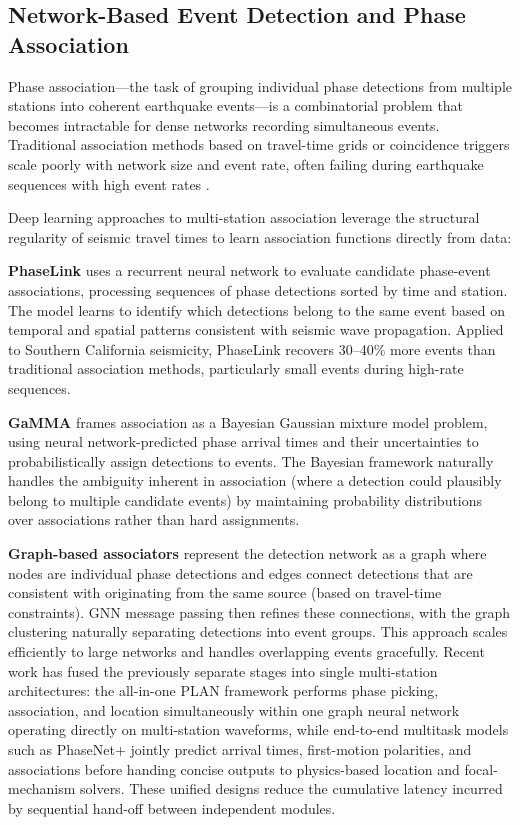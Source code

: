 \documentclass[review,authoryear]{elsarticle}
\begin{document}
\subsection{Network-Based Event Detection and Phase Association}

Phase association---the task of grouping individual phase detections from multiple stations into coherent earthquake events---is a combinatorial problem that becomes intractable for dense networks recording simultaneous events. Traditional association methods based on travel-time grids or coincidence triggers scale poorly with network size and event rate, often failing during earthquake sequences with high event rates \citep{withers1998comparison}.

Deep learning approaches to multi-station association leverage the structural regularity of seismic travel times to learn association functions directly from data:

\textbf{PhaseLink} \citep{ross2019phaselink} uses a recurrent neural network to evaluate candidate phase-event associations, processing sequences of phase detections sorted by time and station. The model learns to identify which detections belong to the same event based on temporal and spatial patterns consistent with seismic wave propagation. Applied to Southern California seismicity, PhaseLink recovers 30--40\% more events than traditional association methods, particularly small events during high-rate sequences.

\textbf{GaMMA} \citep{zhu2022earthquake} frames association as a Bayesian Gaussian mixture model problem, using neural network-predicted phase arrival times and their uncertainties to probabilistically assign detections to events. The Bayesian framework naturally handles the ambiguity inherent in association (where a detection could plausibly belong to multiple candidate events) by maintaining probability distributions over associations rather than hard assignments.

\textbf{Graph-based associators} \citep{mcbrearty2023earthquake, zhang2021spatiotemporal} represent the detection network as a graph where nodes are individual phase detections and edges connect detections that are consistent with originating from the same source (based on travel-time constraints). GNN message passing then refines these connections, with the graph clustering naturally separating detections into event groups. This approach scales efficiently to large networks and handles overlapping events gracefully. Recent work has fused the previously separate stages into single multi-station architectures: the all-in-one PLAN framework \citep{si2024plan} performs phase picking, association, and location simultaneously within one graph neural network operating directly on multi-station waveforms, while end-to-end multitask models such as PhaseNet+ \citep{zhu2025phasenetplus} jointly predict arrival times, first-motion polarities, and associations before handing concise outputs to physics-based location and focal-mechanism solvers. These unified designs reduce the cumulative latency incurred by sequential hand-off between independent modules.
\end{document}
